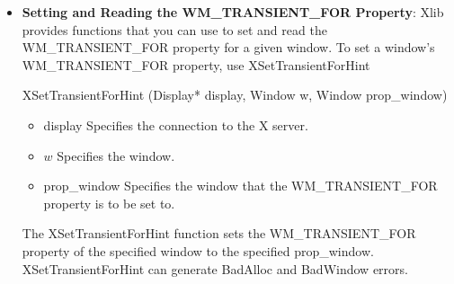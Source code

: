 \documentclass{report}
\begin{document}
\begin{itemize}
\begin{itemize}
\begin{cppcode}
            Status XGetClassHint(Display* display, Window w, XClassHint* class_hints_return)
            \end{cppcode}
            \bigbreak \noindent
            \begin{itemize}
                \item display Specifies the connection to the X server.
                \item $w$ Specifies the window.
                \item class\_hints\_return Returns the XClassHint structure.
            \end{itemize}
            The XGetClassHint function returns the class hint of the specified window to the members of the supplied structure. If the data returned by the server is in the Latin Portable Character Encoding, then the returned strings are in the Host Portable Character Encoding. Otherwise, the result is implementation-dependent. It returns a nonzero status on success; otherwise, it returns a zero status. To free res\_name and res\_class when finished with the strings, use XFree on each individually.
            \bigbreak \noindent 
            XGetClassHint can generate a BadWindow error.
        \item \textbf{Setting and Reading the WM\_TRANSIENT\_FOR Property}: Xlib provides functions that you can use to set and read the WM\_TRANSIENT\_FOR property for a given window.
            \bigbreak \noindent 
            To set a window’s WM\_TRANSIENT\_FOR property, use XSetTransientForHint
            \bigbreak \noindent 
            \begin{cppcode}
            XSetTransientForHint (Display* display, Window w, Window prop_window)
            \end{cppcode}
            \bigbreak \noindent 
            \begin{itemize}
                \item display Specifies the connection to the X server.
                \item $w$ Specifies the window.
                \item prop\_window Specifies the window that the WM\_TRANSIENT\_FOR property is to be set to.
            \end{itemize}
            \bigbreak \noindent 
            The XSetTransientForHint function sets the WM\_TRANSIENT\_FOR property of the specified window to the specified prop\_window.
            \bigbreak \noindent 
            XSetTransientForHint can generate BadAlloc and BadWindow errors.

\end{itemize}
\end{itemize}
\end{document}
